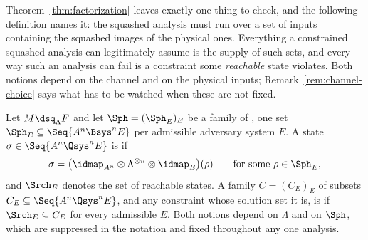 
Theorem~\ref{thm:factorization} leaves exactly one thing to check, and the
following definition names it: the squashed analysis must run over a set of
inputs containing the squashed images of the physical ones. Everything a
constrained squashed analysis can legitimately assume is the supply of such
sets, and every way such an analysis can fail is a constraint some
\emph{reachable} state violates. Both notions depend on the channel and on
the physical inputs; Remark~\ref{rem:channel-choice} says what has to be
watched when these are not fixed.

\begin{definition}\label{def:sound}
Let $M\dsq_{\Lambda}F$ and let $\Sph=(\Sph_E)_E$ be a family of
, one set
$\Sph_E\subseteq\Seq{A^{n}\Bsys^{n}E}$ per admissible adversary system $E$. A
state $\sigma\in\Seq{A^{n}\Qsys^{n}E}$ is  if
\begin{equation}\label{eq:reachable}
  \sigma=\big(\idmap_{A^{n}}\otimes\Lambda^{\otimes n}\otimes\idmap_E\big)(\rho)
  \qquad\text{for some }\rho\in\Sph_E ,
\end{equation}
and $\Srch_E$ denotes the set of reachable states. A family $C=(C_E)_E$ of
subsets $C_E\subseteq\Seq{A^{n}\Qsys^{n}E}$, and any constraint whose solution
set it is, is  if $\Srch_E\subseteq C_E$ for every admissible $E$. Both notions
depend on $\Lambda$ and on $\Sph$, which are suppressed in the notation and
fixed throughout any one analysis.
\end{definition}
